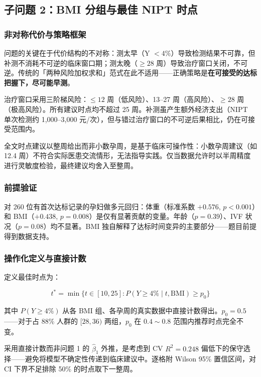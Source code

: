 \documentclass{mcm-paper}
\begin{document}
\subsection{子问题 2：BMI 分组与最佳 NIPT 时点}

\subsubsection{非对称代价与策略框架}

问题的关键在于代价结构的不对称：测太早（Y $<4\%$）导致检测结果不可靠，但补测不消耗不可逆的临床窗口期；测太晚（$\geq 28$ 周）导致治疗窗口关闭，不可逆。传统的「两种风险加权求和」范式在此不适用——正确策略是\textbf{在可接受的达标把握下，尽可能早测}。

治疗窗口采用三阶梯风险：$\leq 12$ 周（低风险）、13--27 周（高风险）、$\geq 28$ 周（极高风险）。所有建议时点均不超过 25 周。补测虽产生额外经济支出（NIPT 单次检测约 1,000--3,000 元/次），但与错过治疗窗口的不可逆后果相比，仍在可接受范围内。

全文时点建议以整周给出而非小数孕周，是基于临床可操作性：小数孕周建议（如 12.4 周）不符合实际医患交流情形，无法指导实践。仅当数据允许时以半周精度进行灵敏度检验，最终建议均舍入至整周。

\subsubsection{前提验证}

对 260 位有首次达标记录的孕妇做多元回归：体重（标准系数 $+0.576$, $p<0.001$）和 BMI（$+0.438$, $p=0.008$）是仅有显著贡献的变量。年龄（$p=0.39$）、IVF 状况（$p=0.08$）均不显著。BMI 独自解释了达标时间变异的主要部分——题目前提得到数据支持。

\subsubsection{操作化定义与直接计数}

定义最佳时点为：

\begin{equation}
t^* = \min\Big\{ t \in [10, 25] : P(Y \geq 4\% \mid t, \mathrm{BMI}) \geq p_0 \Big\}
\end{equation}

其中 $P(Y\geq 4\%)$ 从各 BMI 组、各孕周的真实数据中直接计数得出。$p_0=0.5$——对于占 88\% 人群的 $[28,36)$ 两组，$p_0$ 在 $0.4\sim0.8$ 范围内推荐时点完全不变。

采用直接计数而非问题 1 的 $\hat{\beta}_1$ 外推，是考虑到 CV $R^2=0.248$ 偏低下的保守选择——避免将模型不确定性传递到临床建议中。逐格附 Wilson 95\% 置信区间，对 CI 下界不足排除 50\% 的时点取下一整周。
\end{document}
